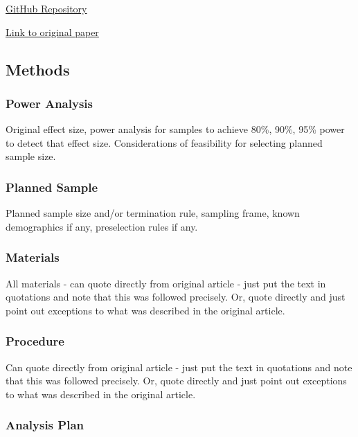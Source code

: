 \documentclass[
  letterpaper,
  DIV=11,
  numbers=noendperiod]{scrartcl}
\begin{document}
\href{https://github.com/Asad-Tariq/critcher2013}{GitHub Repository}

\href{https://github.com/Asad-Tariq/critcher2013/blob/main/original_paper/Critcher_et_al_2013.pdf}{Link
to original paper}

\subsection{Methods}\label{methods}

\subsubsection{Power Analysis}\label{power-analysis}

Original effect size, power analysis for samples to achieve 80\%, 90\%,
95\% power to detect that effect size. Considerations of feasibility for
selecting planned sample size.

\subsubsection{Planned Sample}\label{planned-sample}

Planned sample size and/or termination rule, sampling frame, known
demographics if any, preselection rules if any.

\subsubsection{Materials}\label{materials}

All materials - can quote directly from original article - just put the
text in quotations and note that this was followed precisely. Or, quote
directly and just point out exceptions to what was described in the
original article.

\subsubsection{Procedure}\label{procedure}

Can quote directly from original article - just put the text in
quotations and note that this was followed precisely. Or, quote directly
and just point out exceptions to what was described in the original
article.

\subsubsection{Analysis Plan}\label{analysis-plan}
\end{document}
